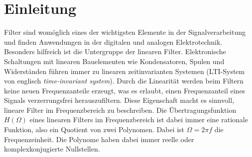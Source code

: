 \section{Einleitung}

Filter sind womöglich eines der wichtigsten Elemente in der Signalverarbeitung und finden Anwendungen in der digitalen und analogen Elektrotechnik.
Besonders hilfreich ist die Untergruppe der linearen Filter.
Elektronische Schaltungen mit linearen Bauelementen wie Kondensatoren, Spulen und Widerständen führen immer zu linearen zeitinvarianten Systemen (LTI-System von englisch \textit{time-invariant system}).
Durch die Linearität werden beim Filtern keine neuen Frequenzanteile erzeugt, was es erlaubt, einen Frequenzanteil eines Signals verzerrungsfrei herauszufiltern.
Diese Eigenschaft macht es sinnvoll, lineare Filter im Frequenzbereich zu beschreiben.
Die Übertragungsfunktion $H(\Omega)$ eines linearen Filters im Frequenzbereich ist dabei immer eine rationale Funktion, also ein Quotient von zwei Polynomen.
Dabei ist $\Omega = 2 \pi f$ die Frequenzeinheit.
Die Polynome haben dabei immer reelle oder komplexkonjugierte Nullstellen.

